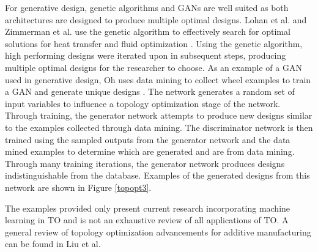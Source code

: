 For generative design, genetic algorithms and GANs are well suited as both architectures are designed to produce multiple optimal designs. Lohan et al. and Zimmerman et al. use the genetic algorithm to effectively search for optimal solutions for heat transfer and fluid optimization \cite{Lohan2016,Zimmermann2018}. Using the genetic algorithm, high performing designs were iterated upon in subsequent steps, producing multiple optimal designs for the researcher to choose. As an example of a GAN used in generative design, Oh uses data mining to collect wheel examples to train a GAN and generate unique designs \cite{Oh2019}. The network generates a random set of input variables to influence a topology optimization stage of the network. Through training, the generator network attempts to produce new designs similar to the examples collected through data mining. The discriminator network is then trained using the sampled outputs from the generator network and the data mined examples to determine which are generated and are from data mining. Through many training iterations, the generator network produces designs indistinguishable from the database. Examples of the generated designs from this network are shown in Figure \ref{topopt3}.


The examples provided only present current research incorporating machine learning in TO and is not an exhaustive review of all applications of TO. A general review of topology optimization advancements for additive manufacturing can be found in Liu et al\cite{Liu2018}.

